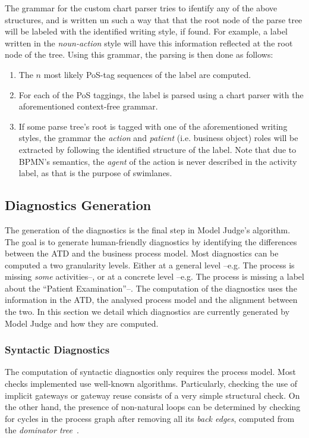 The grammar for the custom chart parser tries to ifentify any of the above
structures, and is written un such a way that that the root node of the parse
tree will be labeled with the identified writing style, if found. For example, a
label written in the \emph{noun-action} style will have this information
reflected at the root node of the tree. Using this grammar, the parsing is then
done as follows:

\begin{enumerate}
  \item {The $n$ most likely PoS-tag sequences of the label are computed.}
  \item {For each of the PoS taggings, the label is parsed using a chart
        parser with the aforementioned context-free grammar.}
  \item {If some parse tree's root is tagged with one of the aforementioned
      writing styles, the grammar the \emph{action} and \emph{patient} (i.e.
      business object) roles will be extracted by following the identified
      structure of the label. Note that due to BPMN's semantics, the
      \emph{agent} of the action is never described in the activity label, as
      that is the purpose of swimlanes.}
    
    
\end{enumerate}


\subsection{Diagnostics Generation}
\label{sec:diagnostics_generation}

The generation of the diagnostics is the final step in Model Judge's
algorithm. The goal is to generate human-friendly diagnostics by identifying the
differences between the ATD and the business process model. Most diagnostics can
be computed a two granularity levels. Either at a general level --e.g. The
process is missing \emph{some} activities--, or at a concrete level --e.g. The
process is missing a label about the ``Patient Examination''--. The computation
of the diagnostics uses the information in the ATD, the analysed process model
and the alignment between the two. In this section we detail which diagnostics
are currently generated by Model Judge and how they are computed.

\subsubsection*{Syntactic Diagnostics}
The computation of syntactic diagnostics only requires the
process model. Most checks implemented use well-known algorithms. Particularly,
checking the use of implicit gateways or gateway reuse consists of a very simple
structural check. On the other hand, the presence of non-natural loops can be
determined by checking for cycles in the process graph after removing all its
{\em back edges}, computed from the {\em dominator tree}~\cite{LengauerT79}.

